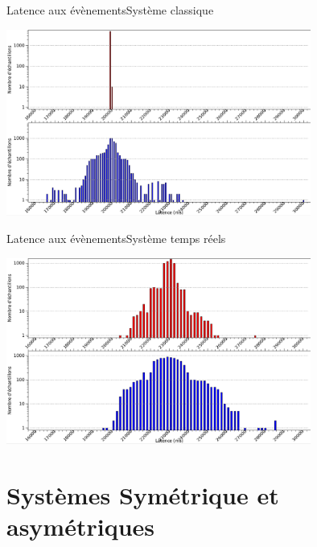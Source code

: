 \begin{frame}{Latence aux évènements}{Système classique}
  \begin{center}
    \includegraphics[width=10cm]{latency_2}
  \end{center}
\end{frame}

\begin{frame}{Latence aux évènements}{Système temps réels}
  \begin{center}
    \includegraphics[width=10cm]{latency_1}
  \end{center}
\end{frame}

\section{Systèmes Symétrique et asymétriques}

